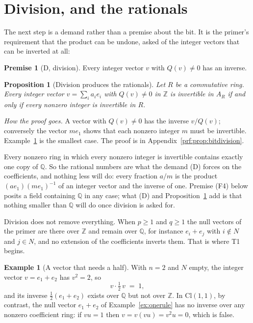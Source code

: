 \documentclass[11pt]{article}
\theoremstyle{plain}
\theoremstyle{definition}
\newtheorem{example}{Example}
\theoremstyle{plain}
\newtheorem{proposition}[theorem]{Proposition}
\theoremstyle{definition}
\newtheorem*{premise}{Premise}
\newcommand{\Cl}{\mathrm{Cl}}
\newcommand{\Z}{\mathbb{Z}}
\newcommand{\Q}{\mathbb{Q}}
\begin{document}
\section{Division, and the rationals}\label{sec:division}

The next step is a demand rather than a premise about the bit. It is the primer's requirement \cite[Section 2]{ButlerT0} that the product can be undone, asked of the integer vectors that can be inverted at all:

\begin{premise}[D, division]
Every integer vector $v$ with $Q(v) \neq 0$ has an inverse.
\end{premise}

\begin{proposition}[Division produces the rationals]\label{prop:bitdivision}
Let $R$ be a commutative ring. Every integer vector $v = \sum_{i} a_{i}e_{i}$ with $Q(v) \neq 0$ in $\Z$ is invertible in $A_{R}$ if and only if every nonzero integer is invertible in $R$.
\end{proposition}

\noindent\emph{How the proof goes.} A vector with $Q(v) \neq 0$ has the inverse $v/Q(v)$; conversely the vector $m e_{1}$ shows that each nonzero integer $m$ must be invertible. Example~\ref{ex:half} is the smallest case. The proof is in Appendix~\ref{prf:prop:bitdivision}.

Every nonzero ring in which every nonzero integer is invertible contains exactly one copy of $\Q$. So the rational numbers are what the demand (D) forces on the coefficients, and nothing less will do: every fraction $a/m$ is the product $(a e_{1})(m e_{1})^{-1}$ of an integer vector and the inverse of one. Premise (F4) below posits a field containing $\Q$ in any case; what (D) and Proposition~\ref{prop:bitdivision} add is that nothing smaller than $\Q$ will do once division is asked for.

Division does not remove everything. When $p \geq 1$ and $q \geq 1$ the null vectors of the primer \cite[Section 4]{ButlerT0} are there over $\Z$ and remain over $\Q$, for instance $e_{i} + e_{j}$ with $i \notin N$ and $j \in N$, and no extension of the coefficients inverts them. That is where T1 begins.

\begin{example}[A vector that needs a half]\label{ex:half}
With $n = 2$ and $N$ empty, the integer vector $v = e_{1} + e_{2}$ has $v^{2} = 2$, so
\[
v \cdot \tfrac12\,v \;=\; 1 ,
\]
and its inverse $\tfrac12(e_{1} + e_{2})$ exists over $\Q$ but not over $\Z$. In $\Cl(1,1)$, by contrast, the null vector $e_{1} + e_{2}$ of Example~\ref{ex:onerule} has no inverse over any nonzero coefficient ring: if $vu = 1$ then $v = v(vu) = v^{2}u = 0$, which is false.
\end{example}
\end{document}

